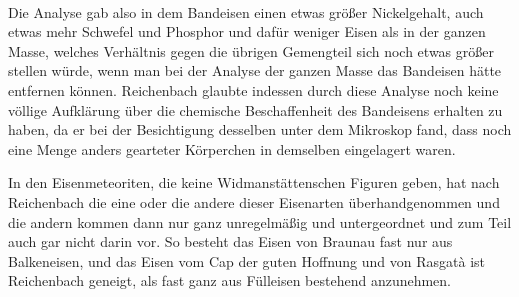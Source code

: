 \documentclass[a4paper, 11pt, oneside]{article}
\begin{document}
\paragraph{}
Die Analyse gab also in dem Bandeisen einen etwas größer Nickelgehalt, auch etwas mehr Schwefel und Phosphor und dafür weniger Eisen als in der ganzen Masse, welches Verhältnis gegen die übrigen Gemengteil sich noch etwas größer stellen würde, wenn man bei der Analyse der ganzen Masse das Bandeisen hätte entfernen können. Reichenbach glaubte indessen durch diese Analyse noch keine völlige Aufklärung über die chemische Beschaffenheit des Bandeisens erhalten zu haben, da er bei der Besichtigung desselben unter dem Mikroskop fand, dass noch eine Menge anders gearteter Körperchen in demselben eingelagert waren.

In den Eisenmeteoriten, die keine Widmanstättenschen Figuren geben, hat nach Reichenbach die eine oder die andere dieser Eisenarten überhandgenommen und die andern kommen dann nur ganz unregelmäßig und untergeordnet und zum Teil auch gar nicht darin vor. So besteht das Eisen von Braunau fast nur aus Balkeneisen, und das Eisen vom Cap der guten Hoffnung und von Rasgatà ist Reichenbach geneigt, als fast ganz aus Fülleisen bestehend anzunehmen.
\end{document}
